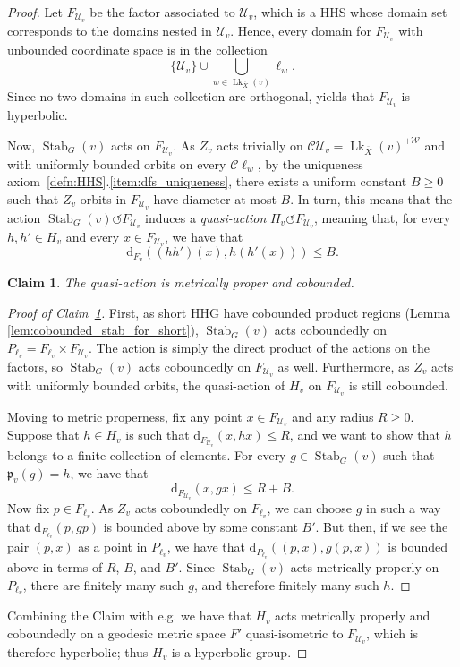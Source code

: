 \documentclass[svgnames]{amsart}
\theoremstyle{plain}
\newtheorem{claim}[thm]{Claim}
\theoremstyle{definition}
\newenvironment{claimproof}{\renewcommand{\qedsymbol}{$\blacksquare$}\begin{proof}}{\end{proof}}
\newcommand{\C}{\mathcal C}
\newcommand{\ov}[1]{\overline{#1}}
\newcommand{\U}{\mathcal{U}}
\newcommand{\dist}{\mathrm{d}}
\newcommand{\link}{\operatorname{Lk}}
\newcommand{\Stab}[2]{\operatorname{Stab}_{#1}(#2)}
\newcommand{\W}{\mathcal{W}}
\newcommand{\p}{\mathfrak{p}}
\begin{document}
\begin{proof}
Let $F_{\U_v}$ be the factor associated to $\U_v$, which is a HHS whose domain set corresponds to the domains nested in $\U_v$. Hence, every domain for $F_{\U_v}$ with unbounded coordinate space is in the collection 
$$\{\U_v\}\cup\bigcup_{w\in\link_{\ov X}(v)} \ell_w.$$
Since no two domains in such collection are orthogonal, \cite[Theorem 3.2]{russell} yields that $F_{\U_v}$ is hyperbolic.



Now, $\Stab{G}{v}$ acts on $F_{\U_v}$. As $Z_v$ acts trivially on $\C\U_v=\link_{\ov X}(v)^{+\W}$ and with uniformly bounded orbits on every $\C\ell_w$, by the uniqueness axiom~\ref{defn:HHS}.\eqref{item:dfs_uniqueness}, there exists a uniform constant $B\ge 0$ such that $Z_v$-orbits in $F_{\U_v}$ have diameter at most $B$. In turn, this means that the action $\Stab{G}{v}\circlearrowleft F_{\U_v}$ induces a \emph{quasi-action} $H_v\circlearrowleft F_{\U_v}$, meaning that, for every $h,h'\in H_v$ and every $x\in F_{\U_v}$, we have that
$$\dist_{F_v}\left( (h h')(x), h(h'(x))\right)\le B.$$
\begin{claim}\label{claim:quasiaction_geometric_H_V}
    The quasi-action is metrically proper and cobounded.
\end{claim}

\begin{claimproof}[Proof of Claim~\ref{claim:quasiaction_geometric_H_V}]
First, as short HHG have cobounded product regions (Lemma \ref{lem:cobounded_stab_for_short}), $\Stab{G}{v}$ acts coboundedly on $P_{\ell_v}=F_{\ell_v}\times F_{\U_v}$. The action is simply the direct product of the actions on the factors, so $\Stab{G}{v}$ acts coboundedly on $F_{\U_v}$ as well. Furthermore, as $Z_v$ acts with uniformly bounded orbits, the quasi-action of $H_v$ on $F_{\U_v}$ is still cobounded. 
\par\medskip
Moving to metric properness, fix any point $x\in F_{\U_v}$ and any radius $R\ge0$. Suppose that $h\in H_v$ is such that $\dist_{F_{\U_v}}(x,hx)\le R$, and we want to show that $h$ belongs to a finite collection of elements. For every $g\in \Stab{G}{v}$ such that $\p_v(g)=h$, we have that
$$\dist_{F_{\U_v}}(x,gx)\le R+B.$$
Now fix $p\in F_{\ell_v}$. As $Z_v$ acts coboundedly on $F_{\ell_v}$, we can choose $g$ in such a way that $\dist_{F_{\ell_v}}(p,gp)$ is bounded above by some constant $B'$. But then, if we see the pair $(p, x)$ as a point in $P_{\ell_v}$, we have that $\dist_{P_{\ell_v}}\left((p,x),g(p,x)\right)$ is bounded above in terms of $R$, $B$, and $B'$. Since $\Stab{G}{v}$ acts metrically properly on $P_{\ell_v}$, there are finitely many such $g$, and therefore finitely many such $h$.
\end{claimproof}
Combining the Claim with e.g. \cite[Proposition 4.4]{Manning_pseudochar} we have that $H_v$ acts metrically properly and coboundedly on a geodesic metric space $F'$ quasi-isometric to $F_{\U_v}$, which is therefore hyperbolic; thus $H_v$ is a hyperbolic group.


\end{proof}
\end{document}
